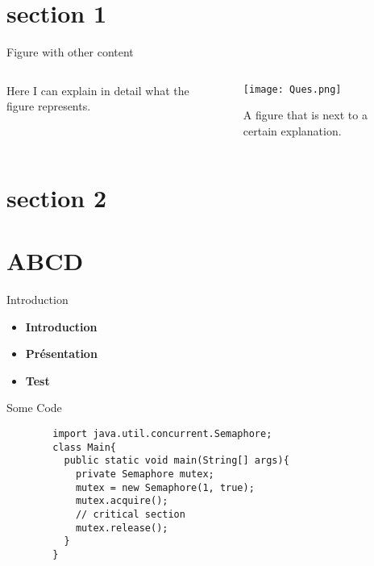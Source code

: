 
\section{section 1}

\begin{frame}{Figure with other content}
\begin{columns}
\begin{column}{0.5\textwidth}
        Here I can explain in detail what the figure represents.
\end{column}
\begin{column}{0.5\textwidth}
    \begin{figure}
    \centering
        \texttt{[image: Ques.png]}
        \caption{A figure that is next to a certain explanation.}
    \end{figure}
\end{column}
\end{columns}
\end{frame}

\section{section 2}
\frame{}
\section{ABCD}
\frame{}

\begin{frame}{Introduction}
    \begin{itemize}
        \item <1>\textbf{Introduction}
        \item <2>\textbf{Présentation}
        \item <3>\textbf{Test}
    \end{itemize}
\end{frame}

\begin{frame}[containsverbatim]{Some Code}
    \begin{verbatim}
        import java.util.concurrent.Semaphore;
        class Main{
          public static void main(String[] args){
            private Semaphore mutex;
            mutex = new Semaphore(1, true);
            mutex.acquire();
            // critical section
            mutex.release();
          }
        }
    \end{verbatim}
\end{frame}
